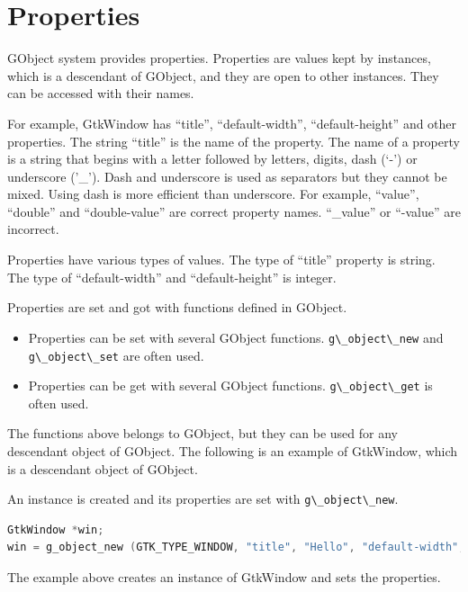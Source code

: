 \section{Properties}\label{properties}

GObject system provides properties. Properties are values kept by
instances, which is a descendant of GObject, and they are open to other
instances. They can be accessed with their names.

For example, GtkWindow has ``title'', ``default-width'',
``default-height'' and other properties. The string ``title'' is the
name of the property. The name of a property is a string that begins
with a letter followed by letters, digits, dash (`-') or underscore
('\_'). Dash and underscore is used as separators but they cannot be
mixed. Using dash is more efficient than underscore. For example,
``value'', ``double'' and ``double-value'' are correct property names.
``\_value'' or ``-value'' are incorrect.

Properties have various types of values. The type of ``title'' property
is string. The type of ``default-width'' and ``default-height'' is
integer.

Properties are set and got with functions defined in GObject.

\begin{itemize}
\tightlist
\item
  Properties can be set with several GObject functions.
  \passthrough{\lstinline!g\_object\_new!} and
  \passthrough{\lstinline!g\_object\_set!} are often used.
\item
  Properties can be get with several GObject functions.
  \passthrough{\lstinline!g\_object\_get!} is often used.
\end{itemize}

The functions above belongs to GObject, but they can be used for any
descendant object of GObject. The following is an example of GtkWindow,
which is a descendant object of GObject.

An instance is created and its properties are set with
\passthrough{\lstinline!g\_object\_new!}.

\begin{lstlisting}[language=C]
GtkWindow *win;
win = g_object_new (GTK_TYPE_WINDOW, "title", "Hello", "default-width", 800, "default-height", 600, NULL);
\end{lstlisting}

The example above creates an instance of GtkWindow and sets the
properties.


